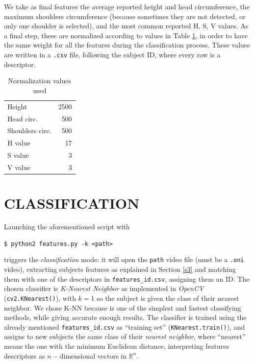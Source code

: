 \documentclass[letterpaper, 11pt, conference]{ieeeconf} %
\begin{document}
We take as final features the average reported height and head circumference, the maximum shoulders circumference (because sometimes they are not detected, or only one shoulder is selected), and the most common reported H, S, V values. As a final step, these are normalized according to values in Table \ref{t4}, in order to have the same weight for all the features during the classification process. These values are written in a \texttt{.csv} file, following the subject ID, where every row is a descriptor.

\begin{table}[h]
\centering
\begin{tabular}{lr}
	Height & 2500\\
	Head circ. & 500\\
	Shoulders circ. & 500\\
	H value & 17\\
	S value & 3\\
	V value & 3\\
\end{tabular}
\caption{Normalization values used} \label{t4}
\vspace{-1em}
\end{table}

\addtolength{\textheight}{-6.5cm} %

\section{CLASSIFICATION} \label{s4}
Launching the aforementioned script with

\begin{center}
\texttt{\$ python2 features.py -k <path>}
\end{center}

triggers the \emph{classification} mode: it will open the \texttt{path} video file (must be a \texttt{.oni} video), extracting subjects features as explained in Section \ref{s3} and matching them with one of the descriptors in \texttt{features\_id.csv}, assigning them an ID.
The chosen classifier is \emph{K-Nearest Neighbor}\cite{c8} as implemented in \emph{OpenCV} (\texttt{cv2.KNearest()}), with $k=1$ so the subject is given the class of their nearest neighbor. We chose K-NN because is one of the simplest and fastest classifying methods, while giving accurate enough results.
The classifier is trained using the already mentioned \texttt{features\_id.csv} as ``training set'' (\texttt{KNearest.train()}), and assigns to new subjects the same class of their \emph{nearest neighbor}, where ``nearest'' means the one with the minimum Euclidean distance, interpreting features descriptors as $n-$dimensional vectors in $\mathbb{R}^n$.
\end{document}
